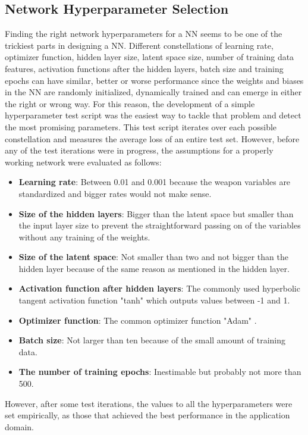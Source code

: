 \documentclass[MGS,Master,english]{twbook}%
\begin{document}
\subsection{Network Hyperparameter Selection} \label{chapter::vae::network}
Finding the right network hyperparameters for a \ac{NN} seems to be one of the trickiest parts in designing a \ac{NN}. Different constellations of learning rate, optimizer function, hidden layer size, latent space size, number of training data features, activation functions after the hidden layers, batch size and training epochs can have similar, better or worse performance since the weights and biases in the \ac{NN} are randomly initialized, dynamically trained and can emerge in either the right or wrong way. For this reason, the development of a simple hyperparameter test script was the easiest way to tackle that problem and detect the most promising parameters. This test script iterates over each possible constellation and measures the average loss of an entire test set. However, before any of the test iterations were in progress, the assumptions for a properly working network were evaluated as follows:
\begin{itemize}
	\item \textbf{Learning rate}: Between 0.01 and 0.001 because the weapon variables are standardized and bigger rates would not make sense.
	\item \textbf{Size of the hidden layers}: Bigger than the latent space but smaller than the input layer size to prevent the straightforward passing on of the variables without any training of the weights.
	\item \textbf{Size of the latent space}: Not smaller than two and not bigger than the hidden layer because of the same reason as mentioned in the hidden layer.
	\item \textbf{Activation function after hidden layers}: The commonly used hyperbolic tangent activation function  "tanh" which outputs values between -1 and 1. 
	\item \textbf{Optimizer function}: The common optimizer function "Adam" \cite{ml::optimizer::overview}.
	\item \textbf{Batch size}: Not larger than ten because of the small amount of training data.
	\item \textbf{The number of training epochs}: Inestimable but probably not more than 500.
\end{itemize}
However, after some test iterations, the values to all the hyperparameters were set empirically, as those that achieved the best performance in the application domain.
\end{document}
